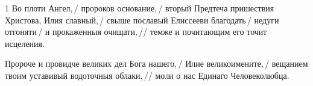 


\begin{hangparas}{\hpindent}{1}
\large
Во плоти Ангел,\,/ пророков основание,\,/ вторый Предтеча пришествия Христова, Илия славный,\,/ свыше пославый Елиссееви благодать\,/ недуги отгоняти\,/ и прокаженныя очищати,\,// темже и почитающим его точит исцеления.

\pagebreak
{}

Пророче и провидче великих дел Бога нашего,\,/ Илие великоимените,\,/ вещанием твоим уставивый водоточныя облаки,\,// моли о нас Единаго Человеколюбца.
%
\end{hangparas}

